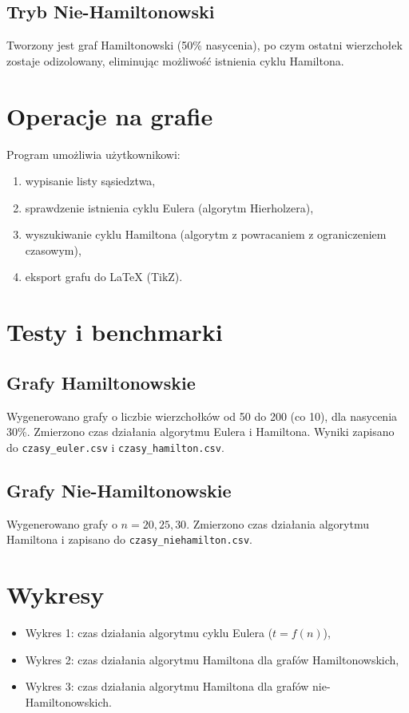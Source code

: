 \documentclass[a4paper,12pt]{article}
\begin{document}
\subsection{Tryb Nie-Hamiltonowski}
Tworzony jest graf Hamiltonowski (50\% nasycenia), po czym ostatni wierzchołek zostaje odizolowany, eliminując możliwość istnienia cyklu Hamiltona.

\section{Operacje na grafie}
Program umożliwia użytkownikowi:
\begin{enumerate}
    \item wypisanie listy sąsiedztwa,
    \item sprawdzenie istnienia cyklu Eulera (algorytm Hierholzera),
    \item wyszukiwanie cyklu Hamiltona (algorytm z powracaniem z ograniczeniem czasowym),
    \item eksport grafu do LaTeX (TikZ).
\end{enumerate}

\section{Testy i benchmarki}
\subsection{Grafy Hamiltonowskie}
Wygenerowano grafy o liczbie wierzchołków od 50 do 200 (co 10), dla nasycenia 30\%. Zmierzono czas działania algorytmu Eulera i Hamiltona. Wyniki zapisano do \texttt{czasy\_euler.csv} i \texttt{czasy\_hamilton.csv}.

\subsection{Grafy Nie-Hamiltonowskie}
Wygenerowano grafy o $n = 20, 25, 30$. Zmierzono czas działania algorytmu Hamiltona i zapisano do \texttt{czasy\_niehamilton.csv}.

\section{Wykresy}
\begin{itemize}
    \item Wykres 1: czas działania algorytmu cyklu Eulera ($t=f(n)$),
    \item Wykres 2: czas działania algorytmu Hamiltona dla grafów Hamiltonowskich,
    \item Wykres 3: czas działania algorytmu Hamiltona dla grafów nie-Hamiltonowskich.
\end{itemize}
\end{document}
